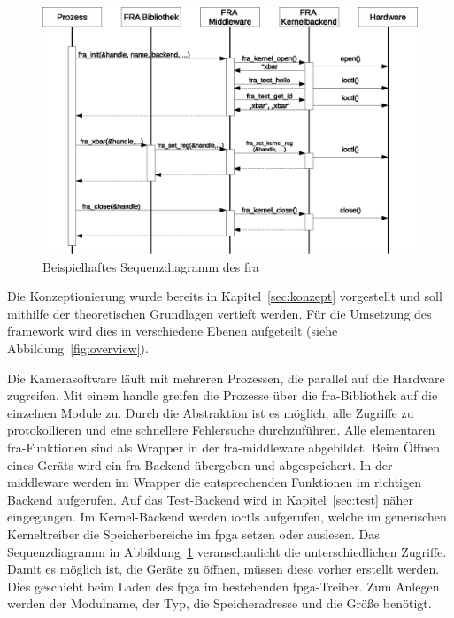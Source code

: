 \begin{figure}[!hb]
	\centering
	\includegraphics[width = \linewidth]{pictures/2020-01-16-SequKernel.eps}
	\smallskip
	\caption{Beispielhaftes Sequenzdiagramm des \ac{fra}}
	\label{fig:sequkern}
\end{figure} 

Die Konzeptionierung wurde bereits in Kapitel~\ref{sec:konzept} vorgestellt und soll mithilfe der theoretischen Grundlagen vertieft werden. Für die Umsetzung des \gls{framework} wird dies in verschiedene Ebenen aufgeteilt (siehe Abbildung~\ref{fig:overview}). 


Die Kamerasoftware läuft mit mehreren Prozessen, die parallel auf die Hardware zugreifen. Mit einem \gls{handle} greifen die Prozesse über die \ac{fra}-Bibliothek auf die einzelnen Module zu. Durch die Abstraktion ist es möglich, alle Zugriffe zu protokollieren und eine schnellere Fehlersuche durchzuführen. 
Alle elementaren \ac{fra}-Funktionen sind als Wrapper in der \ac{fra}-\gls{middleware} abgebildet. Beim Öffnen eines Geräts wird ein \ac{fra}-Backend übergeben und abgespeichert. In der \gls{middleware} werden im Wrapper die entsprechenden Funktionen im richtigen Backend aufgerufen. 
Auf das Test-Backend wird in Kapitel~\ref{sec:test} näher eingegangen. Im Kernel-Backend werden \ac{ioctl}s aufgerufen, welche im generischen Kerneltreiber die Speicherbereiche im \ac{fpga} setzen oder auslesen.
Das Sequenzdiagramm in Abbildung~\ref{fig:sequkern} veranschaulicht die unterschiedlichen Zugriffe.
Damit es möglich ist, die Geräte zu öffnen, müssen diese vorher erstellt werden. Dies geschieht beim Laden des \ac{fpga} im bestehenden \ac{fpga}-Treiber. Zum Anlegen werden der Modulname, der Typ, die Speicheradresse und die Größe benötigt. 





